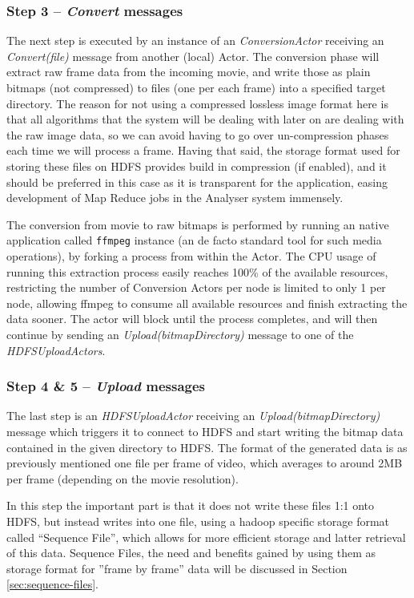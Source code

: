 \subsubsection{Step 3 -- \textit{Convert} messages}
The next step is executed by an instance of an \textit{ConversionActor} receiving an \textit{Convert(file)} message from another (local) Actor. The conversion phase will extract raw frame data from the incoming movie, and write those as plain bitmaps (not compressed) to files (one per each frame) into a specified target directory. The reason for not using a compressed lossless image format here is that all algorithms that the system will be dealing with later on are dealing with the raw image data, so we can avoid having to go over un-compression phases each time we will process a frame. Having that said, the storage format used for storing these files on HDFS provides build in compression (if enabled), and it should be preferred in this case as it is transparent for the application, easing development of Map Reduce jobs in the Analyser system immensely.

The conversion from movie to raw bitmaps is performed by running an native application called \verb|ffmpeg| \cite{ffmpeg} instance (an de facto standard tool for such media operations), by forking a process from within the Actor. The CPU usage of running this extraction process easily reaches 100\% of the available resources, restricting the number of Conversion Actors per node is limited to only 1 per node, allowing ffmpeg to consume all available resources and finish extracting the data sooner. The actor will block until the process completes, and will then continue by sending an \textit{Upload(bitmapDirectory)} message to one of the \textit{HDFSUploadActors}.

\subsubsection{Step 4 \& 5 -- \textit{Upload} messages}
The last step is an \textit{HDFSUploadActor} receiving an \textit{Upload(bitmapDirectory)} message which triggers it to connect to HDFS and start writing the bitmap data contained in the given directory to HDFS. The format of the generated data is as previously mentioned one file per frame of video, which averages to around 2MB per frame (depending on the movie resolution).

In this step the important part is that it does not write these files 1:1 onto HDFS, but instead writes into one file, using a hadoop specific storage format called ``Sequence File'', which allows for more efficient storage and latter retrieval of this data. Sequence Files, the need and benefits gained by using them as storage format for ''frame by frame'' data will be discussed in Section \ref{sec:sequence-files}.

